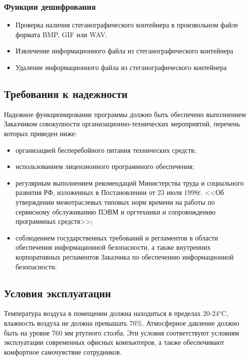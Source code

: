 \subsubsection{Функции дешифрования}
\begin{itemize}
	\item Проверка наличия стеганографического контейнера в произвольном файле формата BMP, GIF или WAV.
	\item Извлечение информационного файла из стеганографического контейнера
	\item Удаление информационного файла из стеганографического контейнера
\end{itemize}




\subsection{Требования к надежности}

Надежное функционирование программы должно быть обеспечено выполнением Заказчиком совокупности организационно-технических мероприятий, перечень которых приведен ниже:

\begin{itemize}
\item организацией бесперебойного питания технических средств;
\item использованием лицензионного программного обеспечения;
\item регулярным выполнением рекомендаций Министерства труда и социального развития РФ, изложенных в Постановлении от 23 июля 1998г. <<Об утверждении межотраслевых типовых норм времени на работы по сервисному обслуживанию ПЭВМ и оргтехники и сопровождению программных средств>>;
\item соблюдением государственных требований и регламентов в области обеспечения информационной безопасности, а также внутренних корпоративных регламентов Заказчика по обеспечению информационной безопасности.

\end{itemize}

\subsection{Условия эксплуатации}

Температура воздуха в помещении должна находиться в пределах 20-24°C, влажность воздуха не должна превышать 70\%. Атмосферное давление должно быть на уровне 760 мм ртутного столба. Эти условия соответствуют условиям эксплуатации современных офисных компьютеров, а также обеспечивают комфортное самочувствие сотрудников.

